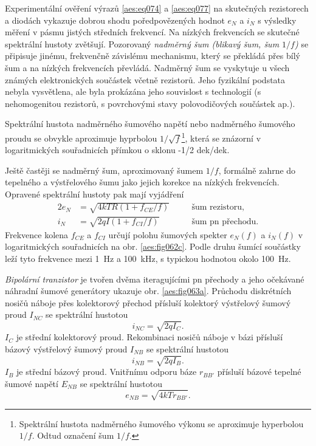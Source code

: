         Experimentální ověření výrazů \ref{aes:eq074} a \ref{aes:eq077} na skutečných rezistorech a
        diodách vykazuje dobrou shodu poředpovězených hodnot \(e_N\) a \(i_N\) s výsledky měření v
        pásmu jistých středních frekvencí. Na nízkých frekvencích se skutečné spektrální hustoty
        zvětšují. Pozorovaný \emph{nadměrný šum (blikavý šum, šum \(1/f\))} se připisuje jinému,
        frekvenčně závislému mechanismu, který se překládá přes bílý šum a na nízkých frekvencích
        převládá. Nadměrný šum se vyskytuje u všech známých elektronických součástek včetně
        rezistorů. Jeho fyzikální podstata nebyla vysvětlena, ale byla prokázána jeho souvislost s
        technologií (s nehomogenitou rezistorů, s povrchovými stavy polovodičových součástek ap.).

        Spektrální hustota nadměrného šumového napětí nebo nadměrného šumového proudu se obvykle
        aproximuje hyprbolou \(1/\sqrt{f}\)\footnote{Spektrální hustota nadměrného šumového výkonu
        se aproximuje hyperbolou \(1/f\). Odtud označení šum \(1/f\).}, která se znázorní v
        logaritmických souřadnicích přímkou o sklonu -1/2 dek/dek. 

        Ještě častěji se nadměrný šum, aproximovaný šumem \(1/f\), formálně zahrne do tepelného a
        výstřelového šumu jako jejich korekce na nízkých frekvencích. Opravené spektrální hustoty
        pak mají vyjádření 
        \begin{alignat}{2}
          e_N &= \sqrt{4kTR(1 + f_{CE}/f)} &&\quad\text{šum rezistoru},   \label{aes:eq078a}   \\
          i_N &= \sqrt{2qI(1 + f_{CI}/f)}  &&\quad\text{šum pn přechodu}. \label{aes:eq078b}
        \end{alignat}
        Frekvence kolena \(f_{CE}\) a \(f_{CI}\) určují polohu šumových spekter \(e_N(f)\) a
        \(i_N(f)\) v logaritmických souřadnicích na obr. \ref{aes:fig062c}. Podle druhu šumící
        součástky leží tyto frekvence mezi \qty{1}{\Hz} a \qty{100}{\kHz}, s typickou hodnotou okolo
        \qty{100}{\Hz}.

        \emph{Bipolární tranzistor} je tvořen dvěma iteragujícími pn přechody a jeho očekávané
        náhradní šumové generátory ukazuje obr. \ref{aes:fig063a}. Průchodu diskrétních nosičů
        náboje přes kolektorový přechod přísluší kolektorý výstřelový šumový proud \(I_{NC}\) se
        spektrální hustotou
        \begin{equation}\label{aes:eq079}
          i_{NC} = \sqrt{2qI_C}.
        \end{equation} 
        \(I_C\) je střední kolektorový proud. Rekombinaci nosičů náboje v bázi přísluší bázový
        výstřelový šumový proud \(I_{NB}\) se spektrální hustotou 
        \begin{equation}\label{aes:eq080}
          i_{NB} = \sqrt{2qI_B}.
        \end{equation} 
        \(I_B\) je střední bázový proud. Vnitřnímu odporu báze \(r_{BB'}\) přísluší bázové tepelné
        šumové napětí \(E_{NB}\) se spektrální hustotou
        \begin{equation}\label{aes:eq081}
          e_{NB} = \sqrt{4kTr_{BB'}}.
        \end{equation} 


